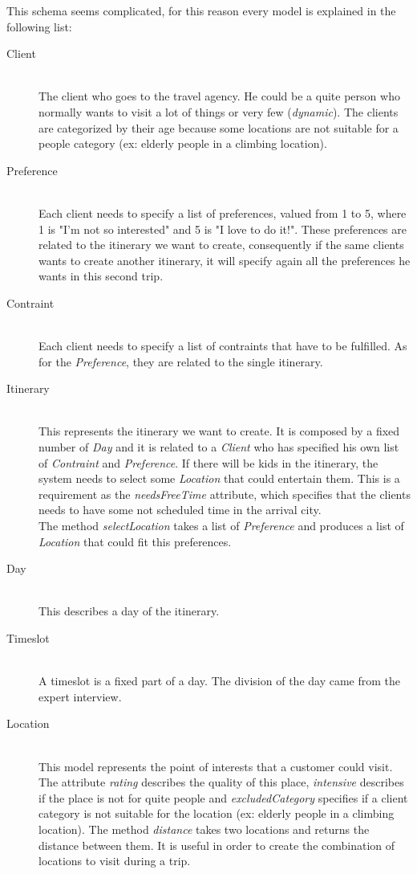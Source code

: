 \documentclass[11pt]{article} %
\begin{document}
This schema seems complicated, for this reason every model is explained in the following list:
\begin{description}
  \item[Client] \hfill \\
  The client who goes to the travel agency. He could be a quite person who normally wants to visit a lot of things or very few (\emph{dynamic}). The clients are categorized by their age because some locations are not suitable for a people category (ex: elderly people in a climbing location).

  \item[Preference] \hfill \\
  Each client needs to specify a list of preferences, valued from 1 to 5, where 1 is "I'm not so interested" and 5 is "I love to do it!". These preferences are related to the itinerary we want to create, consequently if the same clients wants to create another itinerary, it will specify again all the preferences he wants in this second trip.
  \item[Contraint] \hfill \\
  Each client needs to specify a list of contraints that have to be fulfilled. As for the \emph{Preference}, they are related to the single itinerary.
  \item[Itinerary] \hfill \\
  This represents the itinerary we want to create. It is composed by a fixed number of \emph{Day} and it is related to a \emph{Client} who has specified his own list of \emph{Contraint} and \emph{Preference}. If there will be kids in the itinerary, the system needs to select some \emph{Location} that could entertain them. This is a requirement as the \emph{needsFreeTime} attribute, which specifies that the clients needs to have some not scheduled time in the arrival city.\\
The method \emph{selectLocation} takes a list of \emph{Preference} and produces a list of \emph{Location} that could fit this preferences. 
  \item[Day] \hfill \\
  This describes a day of the itinerary.
  \item[Timeslot] \hfill \\
  A timeslot is a fixed part of a day. The division of the day came from the expert interview.
\item[Location] \hfill \\
  This model represents the point of interests that a customer could visit. The attribute \emph{rating} describes the quality of this place, \emph{intensive} describes if the place is not for quite people and \emph{excludedCategory} specifies if a client category is not suitable for the location (ex: elderly people in a climbing location). The method \emph{distance} takes two locations and returns the distance between them. It is useful in order to create the combination of locations to visit during a trip.
\end{description}
\end{document}
